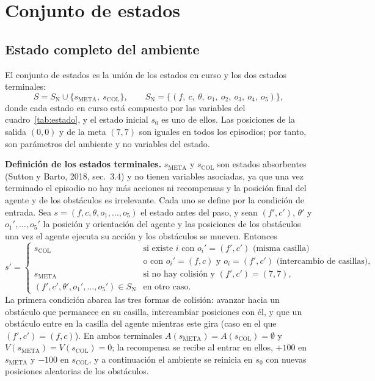 \documentclass[11pt,letterpaper]{article}
\newcommand{\META}{s_{\mathrm{META}}}
\newcommand{\COL}{s_{\mathrm{COL}}}
\begin{document}
\section{Conjunto de estados}

\subsection{Estado completo del ambiente}

El conjunto de estados es la unión de los estados en curso y los dos estados terminales:
\[
  S = S_{\mathrm{N}} \cup \{\META,\ \COL\},\qquad
  S_{\mathrm{N}} = \{(f,\ c,\ \theta,\ o_1,\ o_2,\ o_3,\ o_4,\ o_5)\},
\]
donde cada estado en curso está compuesto por las variables del cuadro~\ref{tab:estado}, y el estado inicial
$s_0$ es uno de ellos. Las posiciones de la salida $(0,0)$ y de la meta $(7,7)$ son iguales en todos los
episodios; por tanto, son parámetros del ambiente y no variables del estado.

\textbf{Definición de los estados terminales.} $\META$ y $\COL$ son estados absorbentes (Sutton y Barto, 2018,
sec.~3.4) y no tienen variables asociadas, ya que una vez terminado el episodio no hay más acciones ni
recompensas y la posición final del agente y de los obstáculos es irrelevante. Cada uno se define por la
condición de entrada. Sea $s=(f,c,\theta,o_1,\dots,o_5)$ el estado antes del paso, y sean $(f',c')$, $\theta'$ y
$o_1',\dots,o_5'$ la posición y orientación del agente y las posiciones de los obstáculos una vez el agente
ejecuta su acción y los obstáculos se mueven. Entonces
\[
  s'=\begin{cases}
    \COL & \text{si existe } i \text{ con } o_i'=(f',c') \text{ (misma casilla)}\\
         & \text{o con } o_i'=(f,c) \text{ y } o_i=(f',c') \text{ (intercambio de casillas)},\\[2pt]
    \META & \text{si no hay colisión y } (f',c')=(7,7),\\[2pt]
    (f',c',\theta',o_1',\dots,o_5')\in S_{\mathrm{N}} & \text{en otro caso.}
  \end{cases}
\]
La primera condición abarca las tres formas de colisión: avanzar hacia un obstáculo que permanece en su casilla,
intercambiar posiciones con él, y que un obstáculo entre en la casilla del agente mientras este gira (caso en el
que $(f',c')=(f,c)$). En ambos terminales $A(\META)=A(\COL)=\emptyset$ y $V(\META)=V(\COL)=0$; la recompensa se
recibe al entrar en ellos, $+100$ en $\META$ y $-100$ en $\COL$, y a continuación el ambiente se reinicia en $s_0$
con nuevas posiciones aleatorias de los obstáculos.
\end{document}
